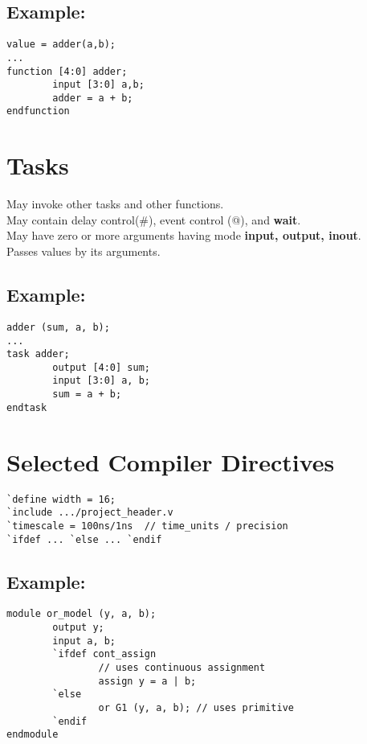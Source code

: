 \documentclass[10pt,twocolumn]{article}
\begin{document}
\subsection*{Example:}\vspace{-10pt}
\begin{lstlisting}
value = adder(a,b);
...
function [4:0] adder;
        input [3:0] a,b;
        adder = a + b;
endfunction
\end{lstlisting}
%
\section*{Tasks}\vspace{-10pt}
May invoke other tasks and other functions.\\
May contain delay control(\#), event control (@), and \textbf{wait}.\\
May have zero or more arguments having mode \textbf{input, output, inout}.\\
Passes values by its arguments.
\subsection*{Example:}\vspace{-10pt}
\begin{lstlisting}
adder (sum, a, b);
...
task adder;
        output [4:0] sum;
        input [3:0] a, b;
        sum = a + b;
endtask
\end{lstlisting}
%
\section*{Selected Compiler Directives}\vspace{-10pt}
\begin{lstlisting}
`define width = 16;
`include .../project_header.v
`timescale = 100ns/1ns  // time_units / precision
`ifdef ... `else ... `endif
\end{lstlisting}
\subsection*{Example:}\vspace{-10pt}
\begin{lstlisting}
module or_model (y, a, b);
        output y;
        input a, b;
        `ifdef cont_assign 
                // uses continuous assignment
                assign y = a | b;
        `else
                or G1 (y, a, b); // uses primitive
        `endif
endmodule       
\end{lstlisting}
%
\end{document}
